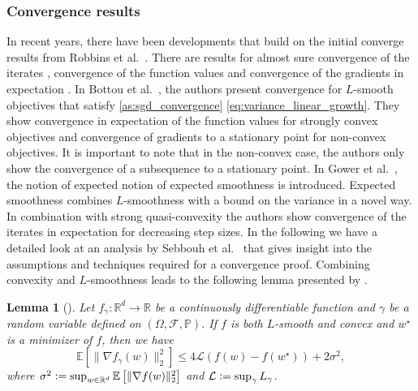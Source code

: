 \documentclass[12pt]{article}
\newtheorem{lemma}[lemma]{Lemma}
\theoremstyle{definition}
\numberwithin{equation}{section}
\newcommand{\R}{\mathbb{R}}
\newcommand{\BP}{\mathbb{P}}
\newcommand{\CF}{\mathcal{F}}
\newcommand{\CL}{\mathcal{L}}
\newcommand{\ev}[1]{\mathbb{E}\left[{#1}\right]}
\newcommand{\norm}[1]{\lVert{#1}\rVert_2}
\newcommand{\defeq}{\vcentcolon=}
\begin{document}
\subsubsection{Convergence results}
\label{sec:convergence_results}
In recent years, there have been developments that build on the initial converge results from Robbins et al.\ \autocite{robbinsStochasticApproximationMethod1951}. There are results for almost sure convergence of the iterates \autocite{zhouStochasticMirrorDescent2017, nguyenSGDHogwildConvergence2018, sebbouhAlmostSureConvergence2021}, convergence of the function values and convergence of the gradients in expectation \autocite{bottouOptimizationMethodsLargeScale2018}.  
In Bottou et al.\ \autocite{bottouOptimizationMethodsLargeScale2018}, the authors present convergence for $L$-smooth objectives that satisfy \autoref{as:sgd_convergence} \ref{eq:variance_linear_growth}. They show convergence in expectation of the function values for strongly convex objectives and convergence of gradients to a stationary point for non-convex objectives. It is important to note that in the non-convex case, the authors only show the convergence of a subsequence to a stationary point. In Gower et al.\ \autocite{gowerSGDGeneralAnalysis2019}, the notion of expected notion of expected smoothness is introduced. Expected smoothness combines $L$-smoothness with a bound on the variance in a novel way. In combination with strong quasi-convexity the authors show convergence of the iterates in expectation for decreasing step sizes.
In the following we have a detailed look at an analysis by Sebbouh et al.\ \autocite{sebbouhAlmostSureConvergence2021} that gives insight into the assumptions and techniques required for a convergence proof.
Combining convexity and $L$-smoothness leads to the following lemma presented by \autocite{sebbouhAlmostSureConvergence2021}.
\begin{lemma}[]
  \label{lemma:gradient_inequality}
  Let $f_{\gamma} : \R^d \rightarrow \R$ be a continuously differentiable function and $\gamma$ be a random variable defined on $(\Omega, \CF, \BP)$. If $f$ is both $L$-smooth and convex and $w^\star$ is a minimizer of $f$, then we have
  \begin{equation}
    \ev{\norm{\nabla f_{\gamma}(w)}^2} \leq 4 \CL (f(w) - f(w^\star)) + 2 \sigma^2,
  \end{equation}
  where $\sigma^2 \defeq \sup_{w \in \R^d} \ev{\norm{\nabla f(w)}^2}$ and $\CL \defeq \sup_{\gamma} L_{\gamma}$.
\end{lemma}
\end{document}
